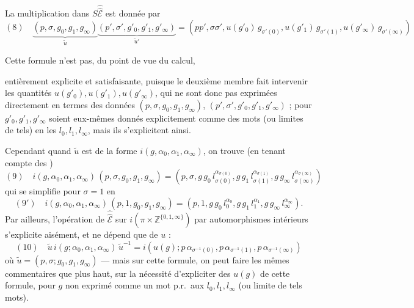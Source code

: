 \documentclass[11pt,a4paper]{article}
\begin{document}
La multiplication dans $S\hat{\hat{\mathcal{E}}}$ est donnée par
\[
(8)\quad \underbrace{(p, \sigma, g_0, g_1, g_\infty)}_{\tilde u}
\underbrace{(p', \sigma', g'_0, g'_1, g'_\infty)}_{\tilde u'} =
(pp', \sigma\sigma', u(g'_0)\,g_{\sigma'(0)}, u(g'_1)\,g_{\sigma'(1)},
u(g'_\infty)\,g_{\sigma'(\infty)})
\]

Cette formule n'est pas, du point de vue du calcul,


entièrement explicite et satisfaisante, puisque le deuxième membre fait
intervenir les quantités $u(g'_0), u(g'_1), u(g'_\infty)$, qui ne sont donc
pas exprimées directement en termes des  données
$(p, \sigma, g_0, g_1, g_\infty)$, $(p', \sigma', g'_0, g'_1, g'_\infty)$ ;
\struck{\ill{}} pour  $g'_0, g'_1, g'_\infty$ soient
eux-mêmes donnés explicitement comme des mots (ou limites de tels) en les
$l_0, l_1, l_\infty$, mais ils s'explicitent ainsi.

Cependant quand $\tilde u$ est de la forme $i(g, \alpha_0, \alpha_1,
\alpha_\infty)$, on trouve (en tenant compte des )
\[
(9)\quad i(g, \alpha_0, \alpha_1, \alpha_\infty)\,(p, \sigma, g_0, g_1,
g_\infty) = (p, \sigma, g\,g_0\,l_{\sigma(0)}^{\alpha_{\sigma(0)}},
g\,g_1\,l_{\sigma(1)}^{\alpha_{\sigma(1)}},
g\,g_\infty\,l_{\sigma(\infty)}^{\alpha_{\sigma(\infty)}})
\]
qui se simplifie pour $\sigma = 1$ en
\[
(9')\quad i(g, \alpha_0, \alpha_1, \alpha_\infty)\,(p, 1, g_0, g_1,
g_\infty) = (p, 1, g\,g_0\,l_0^{\alpha_0}, g\,g_1\,l_1^{\alpha_1},
g\,g_\infty\,l_\infty^{\alpha_\infty}) .
\]
Par ailleurs, l'opération de $\hat{\hat{\mathcal{E}}}$ sur $i(\pi \times
\mathbb{Z}^{\{0,1,\infty\}})$ par automorphismes intérieurs s'explicite
aisément, et ne dépend que de $u$ \struck{\ill{}} :
\[
(10)\quad \tilde u\, i(g; \alpha_0, \alpha_1, \alpha_\infty)\,\tilde u^{-1}
= i(u(g); p\,\alpha_{\sigma^{-1}(0)}, p\,\alpha_{\sigma^{-1}(1)},
p\,\alpha_{\sigma^{-1}(\infty)})
\]
où $\tilde u = (p, \sigma; g_0, g_1, g_\infty)$ --- mais sur cette formule, on
peut faire les mêmes commentaires que plus haut, sur la nécessité
d'expliciter des  $u(g)$ de cette formule, pour $g$ non
exprimé comme un mot p.r.\ aux $l_0, l_1, l_\infty$ (ou limite de tels mots).
\end{document}
